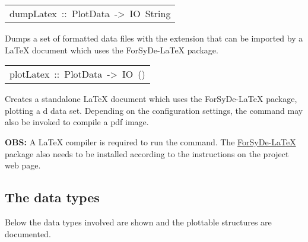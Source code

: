 \begin{haddockdesc}
\item[\begin{tabular}{@{}l}
dumpLatex\ ::\ PlotData\ ->\ IO\ {\char 91}String{\char 93}
\end{tabular}]\haddockbegindoc
Dumps a set of formatted data files with the extension 
 that can be imported by a LaTeX document which uses the
 ForSyDe-LaTeX package.\par


\item[\begin{tabular}{@{}l}
plotLatex\ ::\ PlotData\ ->\ IO\ ()
\end{tabular}]\haddockbegindoc
Creates a standalone LaTeX document which uses the ForSyDe-LaTeX
 package, plotting a d data set. Depending on the
 configuration settings, the command  may also be invoked
 to compile a pdf image.\par
\textbf{OBS:} A LaTeX compiler is required to run the 
 command. The \href{https://github.com/forsyde/forsyde-latex}{ForSyDe-LaTeX}
 package also needs to be installed according to the instructions on
 the project web page.\par

\end{haddockdesc}
\subsection{The data types}
Below the data types involved are shown and the plottable
 structures are documented.\par


